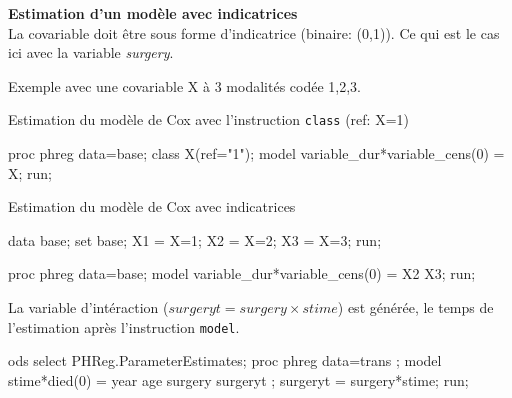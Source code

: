 \documentclass[
  12pt,
  letterpaper,
  DIV=11,
  numbers=noendperiod,
  onepage,
  openany]{scrreprt}
\newenvironment{Shaded}{\begin{snugshade}}{\end{snugshade}}
\newcommand{\AttributeTok}[1]{\textcolor[rgb]{0.80,0.80,0.80}{#1}}
\newcommand{\DecValTok}[1]{\textcolor[rgb]{0.86,0.86,0.80}{#1}}
\newcommand{\FunctionTok}[1]{\textcolor[rgb]{0.94,0.94,0.56}{#1}}
\newcommand{\NormalTok}[1]{\textcolor[rgb]{0.80,0.80,0.80}{#1}}
\newcommand{\OtherTok}[1]{\textcolor[rgb]{0.94,0.94,0.56}{#1}}
\newcommand{\SpecialCharTok}[1]{\textcolor[rgb]{0.86,0.64,0.64}{#1}}
\newcommand{\StringTok}[1]{\textcolor[rgb]{0.80,0.58,0.58}{#1}}
\begin{document}
\textbf{Estimation d'un modèle avec indicatrices}\\
La covariable doit être sous forme d'indicatrice (binaire: (0,1)). Ce
qui est le cas ici avec la variable \emph{surgery}.

Exemple avec une covariable X à 3 modalités codée 1,2,3.

Estimation du modèle de Cox avec l'instruction \texttt{class} (ref: X=1)

\begin{Shaded}
\begin{Highlighting}[]
\NormalTok{proc phreg data}\OtherTok{=}\NormalTok{base;}
\NormalTok{class }\FunctionTok{X}\NormalTok{(}\AttributeTok{ref=}\StringTok{"1"}\NormalTok{);}
\NormalTok{model variable\_dur}\SpecialCharTok{*}\FunctionTok{variable\_cens}\NormalTok{(}\DecValTok{0}\NormalTok{) }\OtherTok{=}\NormalTok{ X; run;}
\end{Highlighting}
\end{Shaded}

Estimation du modèle de Cox avec indicatrices

\begin{Shaded}
\begin{Highlighting}[]
\NormalTok{data base; set base;}
\NormalTok{X1 }\OtherTok{=}\NormalTok{ X}\OtherTok{=}\DecValTok{1}\NormalTok{;}
\NormalTok{X2 }\OtherTok{=}\NormalTok{ X}\OtherTok{=}\DecValTok{2}\NormalTok{;}
\NormalTok{X3 }\OtherTok{=}\NormalTok{ X}\OtherTok{=}\DecValTok{3}\NormalTok{; run;}

\NormalTok{proc phreg data}\OtherTok{=}\NormalTok{base;}
\NormalTok{model variable\_dur}\SpecialCharTok{*}\FunctionTok{variable\_cens}\NormalTok{(}\DecValTok{0}\NormalTok{) }\OtherTok{=}\NormalTok{ X2 X3; run;}
\end{Highlighting}
\end{Shaded}

La variable d'intéraction (\(surgeryt = surgery\times stime\)) est
générée, le temps de l'estimation après l'instruction \texttt{model}.

\begin{Shaded}
\begin{Highlighting}[]
\NormalTok{ods select PHReg.ParameterEstimates;}
\NormalTok{proc phreg data}\OtherTok{=}\NormalTok{trans ;}
\NormalTok{model stime}\SpecialCharTok{*}\FunctionTok{died}\NormalTok{(}\DecValTok{0}\NormalTok{) }\OtherTok{=}\NormalTok{ year age surgery surgeryt ;}
\NormalTok{surgeryt }\OtherTok{=}\NormalTok{ surgery}\SpecialCharTok{*}\NormalTok{stime;}
\NormalTok{run;}
\end{Highlighting}
\end{Shaded}
\end{document}
